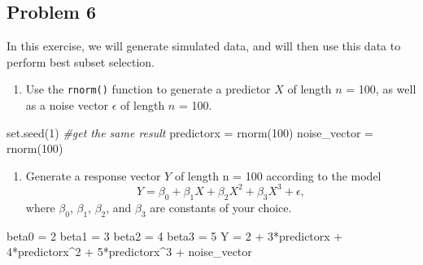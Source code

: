 \documentclass[
]{article}
\newenvironment{Shaded}{\begin{snugshade}}{\end{snugshade}}
\newcommand{\CommentTok}[1]{\textcolor[rgb]{0.56,0.35,0.01}{\textit{#1}}}
\newcommand{\DecValTok}[1]{\textcolor[rgb]{0.00,0.00,0.81}{#1}}
\newcommand{\FunctionTok}[1]{\textcolor[rgb]{0.00,0.00,0.00}{#1}}
\newcommand{\NormalTok}[1]{#1}
\newcommand{\OtherTok}[1]{\textcolor[rgb]{0.56,0.35,0.01}{#1}}
\newcommand{\SpecialCharTok}[1]{\textcolor[rgb]{0.00,0.00,0.00}{#1}}
\providecommand{\tightlist}{%
  \setlength{\itemsep}{0pt}\setlength{\parskip}{0pt}}
\begin{document}
\hypertarget{problem-6}{%
\subsection{Problem 6}\label{problem-6}}

In this exercise, we will generate simulated data, and will then use
this data to perform best subset selection.

\begin{enumerate}
\def\labelenumi{(\alph{enumi})}
\tightlist
\item
  Use the \texttt{rnorm()} function to generate a predictor \(X\) of
  length \(n\) = 100, as well as a noise vector \(\epsilon\) of length
  \(n\) = 100.
\end{enumerate}

\begin{Shaded}
\begin{Highlighting}[]
\FunctionTok{set.seed}\NormalTok{(}\DecValTok{1}\NormalTok{) }\CommentTok{\#get the same result}
\NormalTok{predictorx }\OtherTok{=} \FunctionTok{rnorm}\NormalTok{(}\DecValTok{100}\NormalTok{)}
\NormalTok{noise\_vector }\OtherTok{=} \FunctionTok{rnorm}\NormalTok{(}\DecValTok{100}\NormalTok{)}
\end{Highlighting}
\end{Shaded}

\begin{enumerate}
\def\labelenumi{(\alph{enumi})}
\setcounter{enumi}{1}
\tightlist
\item
  Generate a response vector \(Y\) of length n = 100 according to the
  model \[Y = \beta_0 + \beta_1X + \beta_2X^2 + \beta_3X^3 + \epsilon,\]
  where \(\beta_0\), \(\beta_1\), \(\beta_2\), and \(\beta_3\) are
  constants of your choice.
\end{enumerate}

\begin{Shaded}
\begin{Highlighting}[]
\NormalTok{beta0 }\OtherTok{=} \DecValTok{2}
\NormalTok{beta1 }\OtherTok{=} \DecValTok{3}
\NormalTok{beta2 }\OtherTok{=} \DecValTok{4}
\NormalTok{beta3 }\OtherTok{=} \DecValTok{5}
\NormalTok{Y }\OtherTok{=} \DecValTok{2} \SpecialCharTok{+} \DecValTok{3}\SpecialCharTok{*}\NormalTok{predictorx }\SpecialCharTok{+} \DecValTok{4}\SpecialCharTok{*}\NormalTok{predictorx}\SpecialCharTok{\^{}}\DecValTok{2} \SpecialCharTok{+} \DecValTok{5}\SpecialCharTok{*}\NormalTok{predictorx}\SpecialCharTok{\^{}}\DecValTok{3} \SpecialCharTok{+}\NormalTok{ noise\_vector}
\end{Highlighting}
\end{Shaded}
\end{document}
